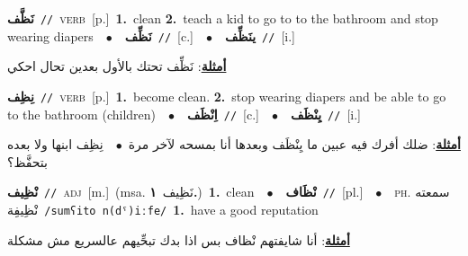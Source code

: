\documentclass[10pt,a4paper,twoside]{article} %
\begin{document}
\begin{multicols}{2}
{\setlength\topsep{0pt}\textbf{\foreignlanguage{arabic}{نَظَّف}}\ {\color{gray}\texttt{//}\color{black}}\ \textsc{verb}\ [p.]\ \textbf{1.}~clean  \textbf{2.}~teach a kid to go to to the bathroom and stop wearing diapers\ \ $\bullet$\ \ \setlength\topsep{0pt}\textbf{\foreignlanguage{arabic}{نَظِّف}}\ {\color{gray}\texttt{//}\color{black}}\ [c.]\ \ $\bullet$\ \ \setlength\topsep{0pt}\textbf{\foreignlanguage{arabic}{ينَظِّف}}\ {\color{gray}\texttt{//}\color{black}}\ [i.]\  \begin{flushright}\color{gray}\foreignlanguage{arabic}{\textbf{\underline{\foreignlanguage{arabic}{أمثلة}}}: نَظِّف تحتك بالأول بعدين تحال احكي}\end{flushright}\color{black}} \vspace{2mm}

{\setlength\topsep{0pt}\textbf{\foreignlanguage{arabic}{نِظِف}}\ {\color{gray}\texttt{//}\color{black}}\ \textsc{verb}\ [p.]\ \textbf{1.}~become clean.  \textbf{2.}~stop wearing diapers and be able to go to the bathroom (children)\ \ $\bullet$\ \ \setlength\topsep{0pt}\textbf{\foreignlanguage{arabic}{اِنْظَف}}\ {\color{gray}\texttt{//}\color{black}}\ [c.]\ \ $\bullet$\ \ \setlength\topsep{0pt}\textbf{\foreignlanguage{arabic}{يِنْظَف}}\ {\color{gray}\texttt{//}\color{black}}\ [i.]\  \begin{flushright}\color{gray}\foreignlanguage{arabic}{\textbf{\underline{\foreignlanguage{arabic}{أمثلة}}}: ضلك أفرك فيه عبين ما يِنْظَف وبعدها أنا بمسحه لآخر مرة\ $\bullet$\ \  نِظِف ابنها ولا بعده بتحفَّظ؟}\end{flushright}\color{black}} \vspace{2mm}

{\setlength\topsep{0pt}\textbf{\foreignlanguage{arabic}{نْظِيف}}\ {\color{gray}\texttt{//}\color{black}}\ \textsc{adj}\ [m.]\ \color{gray}(msa. \foreignlanguage{arabic}{نَظِيف}~\foreignlanguage{arabic}{\textbf{١.}})\color{black}\ \textbf{1.}~clean\ \ $\bullet$\ \ \setlength\topsep{0pt}\textbf{\foreignlanguage{arabic}{نْظَاف}}\ {\color{gray}\texttt{//}\color{black}}\ [pl.]\ \ $\bullet$\ \ \textsc{ph.} \color{gray} \foreignlanguage{arabic}{سمعته نْظِيفِة}\color{black}\ {\color{gray}\texttt{/{\sffamily sumʕito n(dˤ)iːfe}/}\color{black}}\ \textbf{1.}~have a good reputation\  \begin{flushright}\color{gray}\foreignlanguage{arabic}{\textbf{\underline{\foreignlanguage{arabic}{أمثلة}}}: أنا شايفتهم نْظاف بس اذا بدك تبحِّيهم عالسريع مش مشكلة}\end{flushright}\color{black}} \vspace{2mm}


\end{multicols}
\end{document}
